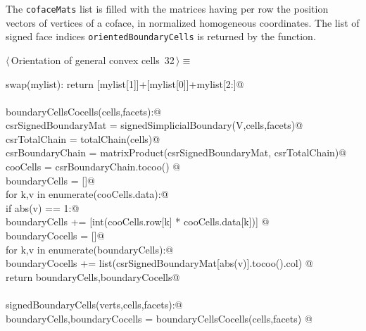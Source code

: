 \documentclass[11pt,oneside]{article}    %
\begin{document}
The \texttt{cofaceMats} list is filled 
with the matrices having per row the position vectors of vertices of a coface, in normalized 
homogeneous coordinates. The list of signed face indices \texttt{orientedBoundaryCells} is returned by the function.

\begin{flushleft} \small \label{scrap52}
\protect{}$\langle\,$Orientation of general convex cells\nobreak\ {\footnotesize 32}$\,\rangle\equiv$
\vspace{-1ex}
\begin{list}{}{} \item
\mbox{}\verb@def swap(mylist): return [mylist[1]]+[mylist[0]]+mylist[2:]@\\
\mbox{}\verb@@\\
\mbox{}\verb@def boundaryCellsCocells(cells,facets):@\\
\mbox{}\verb@    csrSignedBoundaryMat = signedSimplicialBoundary(V,cells,facets)@\\
\mbox{}\verb@    csrTotalChain = totalChain(cells)@\\
\mbox{}\verb@    csrBoundaryChain = matrixProduct(csrSignedBoundaryMat, csrTotalChain)@\\
\mbox{}\verb@    cooCells = csrBoundaryChain.tocoo()    @\\
\mbox{}\verb@    boundaryCells = []@\\
\mbox{}\verb@    for k,v in enumerate(cooCells.data):@\\
\mbox{}\verb@        if abs(v) == 1:@\\
\mbox{}\verb@            boundaryCells += [int(cooCells.row[k] * cooCells.data[k])]            @\\
\mbox{}\verb@    boundaryCocells = []@\\
\mbox{}\verb@    for k,v in enumerate(boundaryCells):@\\
\mbox{}\verb@        boundaryCocells += list(csrSignedBoundaryMat[abs(v)].tocoo().col)        @\\
\mbox{}\verb@    return boundaryCells,boundaryCocells@\\
\mbox{}\verb@@\\
\mbox{}\verb@def signedBoundaryCells(verts,cells,facets):@\\
\mbox{}\verb@    boundaryCells,boundaryCocells = boundaryCellsCocells(cells,facets)        @\\

\end{list}
\end{flushleft}
\end{document}

